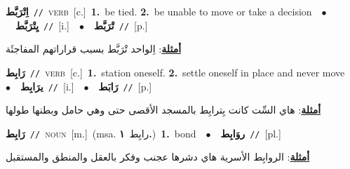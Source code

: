 \documentclass[10pt,a4paper,twoside]{article} %
\begin{document}
\begin{multicols}{2}
{{{{{{{{{\setlength\topsep{0pt}\textbf{\foreignlanguage{arabic}{اِتْرَبَّط}}\ {\color{gray}\texttt{//}\color{black}}\ \textsc{verb}\ [c.]\ \textbf{1.}~be tied.  \textbf{2.}~be unable to move or take a decision\ \ $\bullet$\ \ \setlength\topsep{0pt}\textbf{\foreignlanguage{arabic}{يِتْرَبَّط}}\ {\color{gray}\texttt{//}\color{black}}\ [i.]\ \ $\bullet$\ \ \setlength\topsep{0pt}\textbf{\foreignlanguage{arabic}{تْرَبَّط}}\ {\color{gray}\texttt{//}\color{black}}\ [p.]\  \begin{flushright}\color{gray}\foreignlanguage{arabic}{\textbf{\underline{\foreignlanguage{arabic}{أمثلة}}}: اِلواحد تْرَبَّط بسبب قراراتهم المفاجئَة}\end{flushright}\color{black}} \vspace{2mm}

{\setlength\topsep{0pt}\textbf{\foreignlanguage{arabic}{رَابِط}}\ {\color{gray}\texttt{//}\color{black}}\ \textsc{verb}\ [c.]\ \textbf{1.}~station oneself.  \textbf{2.}~settle oneself in place and never move\ \ $\bullet$\ \ \setlength\topsep{0pt}\textbf{\foreignlanguage{arabic}{يرَابِط}}\ {\color{gray}\texttt{//}\color{black}}\ [i.]\ \ $\bullet$\ \ \setlength\topsep{0pt}\textbf{\foreignlanguage{arabic}{رَابَط}}\ {\color{gray}\texttt{//}\color{black}}\ [p.]\  \begin{flushright}\color{gray}\foreignlanguage{arabic}{\textbf{\underline{\foreignlanguage{arabic}{أمثلة}}}: هاي السِّت كانت بِترابِط بالمسجد الأقصى حتى وهي حامل وبطنها طولها}\end{flushright}\color{black}} \vspace{2mm}

{\setlength\topsep{0pt}\textbf{\foreignlanguage{arabic}{رَابِط}}\ {\color{gray}\texttt{//}\color{black}}\ \textsc{noun}\ [m.]\ \color{gray}(msa. \foreignlanguage{arabic}{رابِط}~\foreignlanguage{arabic}{\textbf{١.}})\color{black}\ \textbf{1.}~bond\ \ $\bullet$\ \ \setlength\topsep{0pt}\textbf{\foreignlanguage{arabic}{روَابِط}}\ {\color{gray}\texttt{//}\color{black}}\ [pl.]\  \begin{flushright}\color{gray}\foreignlanguage{arabic}{\textbf{\underline{\foreignlanguage{arabic}{أمثلة}}}: الروابِط الأسرية هاي دشرها عجنب وفكر بالعقل والمنطق والمستقبل}\end{flushright}\color{black}} \vspace{2mm}

}}}}}}}}
\end{multicols}
\end{document}
